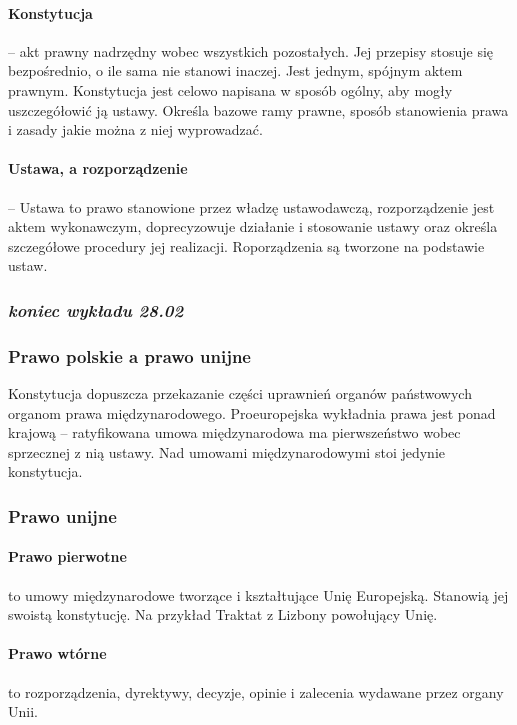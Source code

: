 \message{ !name(owi.tex)}\documentclass{article}
\begin{document}
\paragraph{Konstytucja}-- akt prawny nadrzędny wobec wszystkich pozostałych.
Jej przepisy stosuje się bezpośrednio, o ile sama nie stanowi inaczej.
Jest jednym, spójnym aktem prawnym. Konstytucja jest celowo napisana w sposób ogólny, aby mogły
uszczegółowić ją ustawy.
Określa bazowe ramy prawne, sposób stanowienia prawa i zasady jakie można z niej wyprowadzać.

\paragraph{Ustawa, a rozporządzenie} -- Ustawa to prawo stanowione przez władzę ustawodawczą,
rozporządzenie jest aktem wykonawczym, doprecyzowuje działanie i stosowanie ustawy oraz określa
szczegółowe procedury jej realizacji. Roporządzenia są tworzone na podstawie ustaw.

\subsubsection*{\textit{koniec wykładu 28.02}}

\subsubsection{Prawo polskie a prawo unijne}

Konstytucja dopuszcza przekazanie części uprawnień organów państwowych organom prawa międzynarodowego.
Proeuropejska wykładnia prawa jest ponad krajową --
ratyfikowana umowa międzynarodowa ma pierwszeństwo wobec sprzecznej z nią ustawy.
Nad umowami międzynarodowymi stoi jedynie konstytucja.

\subsubsection{Prawo unijne}

\paragraph[]{Prawo pierwotne}
to umowy międzynarodowe tworzące i kształtujące Unię Europejską. Stanowią jej swoistą konstytucję.
Na przykład Traktat z Lizbony powołujący Unię.

\paragraph[]{Prawo wtórne}
to rozporządzenia, dyrektywy, decyzje, opinie i zalecenia wydawane przez organy Unii.
\end{document}
